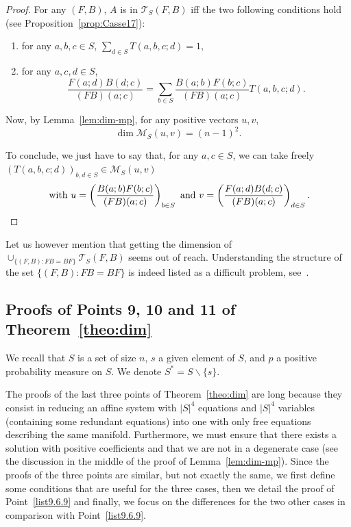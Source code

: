 \documentclass[10pt]{amsart}
\theoremstyle{definition}\newtheorem{defi}[theo]{Definition}\newtheorem{rema}[theo]{Remark}\newtheorem{exam}[theo]{Example}\newtheorem{exem}[theo]{Example}\newtheorem{nota}[theo]{Notation}
\newcounter{a}
\newcommand{\triang}[2]{\mathcal{T}_{#1} \left(#2 \right)}
\begin{document}
\begin{proof}
For any $(F,B)$, $A$ is in $\triang{S}{F,B}$ iff the two following conditions hold (see Proposition~\ref{prop:Casse17}):
\begin{enumerate}
\item for any $a,b,c \in S$, $\sum_{d\in S} T(a,b,c;d) = 1$,
\item for any $a,c,d \in S$,
\[
\frac{F(a;d)B(d;c)}{(FB)(a;c)} = \sum_{b\in S} \frac{B(a;b)F(b;c)}{(FB)(a;c)} T(a,b,c;d).
\]
\end{enumerate}

Now, by Lemma~\ref{lem:dim-mp}, for any positive vectors $u, v$,
\[
\dim \mathcal{M}_S(u,v) = (n-1)^2.
\]

To conclude, we just have to say that, for any $a,c\in S$, we can take freely $(T(a,b,c;d))_{b,d \in S} \in \mathcal{M}_S(u,v)$ 
\[ 
\text{ with }u= \left(\frac{B(a;b)F(b;c)}{(FB)(a;c)} \right)_{b\in S}\\
\text{ and }
v = \left(\frac{F(a;d)B(d;c)}{(FB)(a;c)}\right)_{d \in S}.\qedhere
\]
\end{proof}

Let us however mention that getting the dimension of $ \cup_{\{(F,B) : FB=BF\}} \triang{S}{F,B}$ seems out of reach. Understanding the structure of the set $\{(F,B) : FB=BF\}$ is indeed listed as a difficult problem, see~\cite{Gerstenhaber61,Guralnick92,MT55}.

\subsection{Proofs of Points 9, 10 and 11 of Theorem~\ref{theo:dim}} \label{annex:longdim}

We recall that $S$ is a set of size $n$, $s$ a given element of $S$, and $p$ a positive probability measure on $S$. We denote $S^* = S \backslash \{s\}$.

The proofs of the last three points of Theorem~\ref{theo:dim} are long because they consist in reducing an affine system with $|S|^4$ equations and $|S|^4$ variables (containing some redundant equations) into one with only free equations describing the same manifold. Furthermore, we must ensure that there exists a solution with positive coefficients and that we are not in a degenerate case (see the discussion in the middle of the proof of Lemma~\ref{lem:dim-mp}). Since the proofs of the three points are similar, but not exactly the same, we first define some conditions that are useful for the three cases, then we detail the proof of Point~\eqref{list9.6.9} and finally, we focus on the differences for the two other cases in comparison with Point~\eqref{list9.6.9}.
\end{document}
